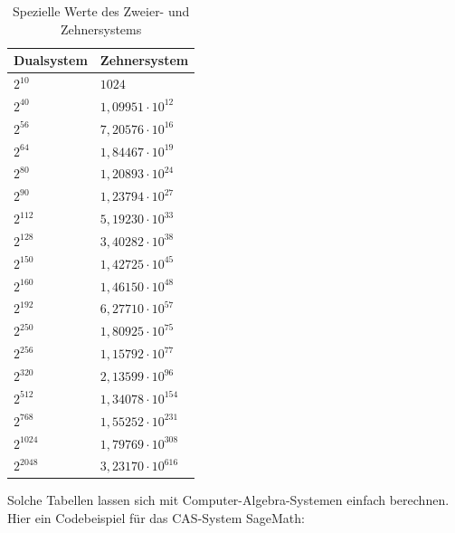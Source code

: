 \begin{refsegment}

\begin{table}[ht]
\begin{center}
\begin{tabular}{|l|l|}\hline
Dualsystem   &   Zehnersystem \\
\hline \hline
$2^{10}$ 	&   $1024$ \\
$2^{40}$ 	&   $1,09951\cdot 10^{12}$ \\
$2^{56}$ 	&   $7,20576\cdot 10^{16}$ \\
$2^{64}$ 	&   $1,84467\cdot 10^{19}$ \\
$2^{80}$ 	&   $1,20893\cdot 10^{24}$ \\
$2^{90}$ 	&   $1,23794\cdot 10^{27}$ \\
$2^{112}$ 	&   $5,19230\cdot 10^{33}$ \\
$2^{128}$ 	&   $3,40282\cdot 10^{38}$ \\
$2^{150}$ 	&   $1,42725\cdot 10^{45}$ \\
$2^{160}$ 	&   $1,46150\cdot 10^{48}$ \\
$2^{192}$ 	&   $6,27710\cdot 10^{57}$ \\
$2^{250}$ 	&   $1,80925\cdot 10^{75}$ \\
$2^{256}$ 	&   $1,15792\cdot 10^{77}$ \\
$2^{320}$ 	&   $2,13599\cdot 10^{96}$ \\
$2^{512}$ 	&   $1,34078\cdot 10^{154}$ \\
$2^{768}$ 	&   $1,55252\cdot 10^{231}$ \\
$2^{1024}$ 	&   $1,79769\cdot 10^{308}$ \\
$2^{2048}$ 	&   $3,23170\cdot 10^{616}$ \\ \hline
\end{tabular}
\caption{Spezielle Werte des Zweier- und Zehnersystems}
\end{center}
\end{table}

Solche Tabellen lassen sich mit Computer-Algebra-Systemen einfach berechnen.
Hier ein Codebeispiel für das CAS-System SageMath:


\end{refsegment}
